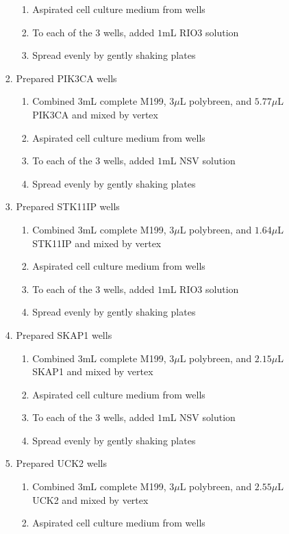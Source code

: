 \begin{enumerate}
\begin{enumerate}
\begin{enumerate}
\begin{enumerate}
							\item Aspirated cell culture medium from wells
							\item To each of the 3 wells, added $1$mL RIO3 solution
							\item Spread evenly by gently shaking plates
						\end{enumerate}
					\item Prepared PIK3CA wells
						\begin{enumerate}
							\item Combined $3$mL complete M199, $3\mu$L polybreen, and $5.77\mu$L PIK3CA and mixed by vertex
							\item Aspirated cell culture medium from wells
							\item To each of the 3 wells, added $1$mL NSV solution
							\item Spread evenly by gently shaking plates
						\end{enumerate}
					\item Prepared STK11IP wells
						\begin{enumerate}
							\item Combined $3$mL complete M199, $3\mu$L polybreen, and $1.64\mu$L STK11IP and mixed by vertex
							\item Aspirated cell culture medium from wells
							\item To each of the 3 wells, added $1$mL RIO3 solution
							\item Spread evenly by gently shaking plates
						\end{enumerate}
					\item Prepared SKAP1 wells
						\begin{enumerate}
							\item Combined $3$mL complete M199, $3\mu$L polybreen, and $2.15\mu$L SKAP1 and mixed by vertex
							\item Aspirated cell culture medium from wells
							\item To each of the 3 wells, added $1$mL NSV solution
							\item Spread evenly by gently shaking plates
						\end{enumerate}
					\item Prepared UCK2 wells
						\begin{enumerate}
							\item Combined $3$mL complete M199, $3\mu$L polybreen, and $2.55\mu$L UCK2 and mixed by vertex
							\item Aspirated cell culture medium from wells

\end{enumerate}
\end{enumerate}
\end{enumerate}
\end{enumerate}

